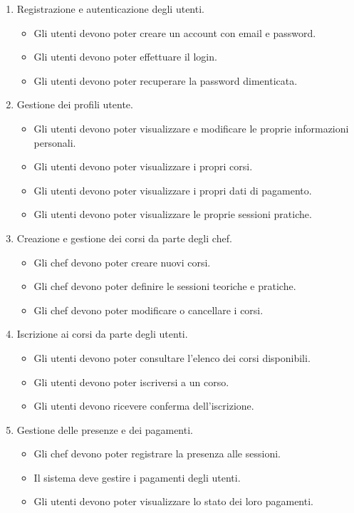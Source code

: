 \begin{enumerate}
    \item Registrazione e autenticazione degli utenti.
    \begin{itemize}
        \item Gli utenti devono poter creare un account con email e password.
        \item Gli utenti devono poter effettuare il login.
        \item Gli utenti devono poter recuperare la password dimenticata.
    \end{itemize}

    \item Gestione dei profili utente.
    \begin{itemize}
        \item Gli utenti devono poter visualizzare e modificare le proprie informazioni personali.
        \item Gli utenti devono poter visualizzare i propri corsi.
        \item Gli utenti devono poter visualizzare i propri dati di pagamento.
        \item Gli utenti devono poter visualizzare le proprie sessioni pratiche.
    \end{itemize}

    \item Creazione e gestione dei corsi da parte degli chef.
    \begin{itemize}
        \item Gli chef devono poter creare nuovi corsi.
        \item Gli chef devono poter definire le sessioni teoriche e pratiche.
        \item Gli chef devono poter modificare o cancellare i corsi.
    \end{itemize}

    \item Iscrizione ai corsi da parte degli utenti.
    \begin{itemize}
        \item Gli utenti devono poter consultare l’elenco dei corsi disponibili.
        \item Gli utenti devono poter iscriversi a un corso.
        \item Gli utenti devono ricevere conferma dell’iscrizione.
    \end{itemize}

    \item Gestione delle presenze e dei pagamenti.
    \begin{itemize}
        \item Gli chef devono poter registrare la presenza alle sessioni.
        \item Il sistema deve gestire i pagamenti degli utenti.
        \item Gli utenti devono poter visualizzare lo stato dei loro pagamenti.
    \end{itemize}
\end{enumerate}

